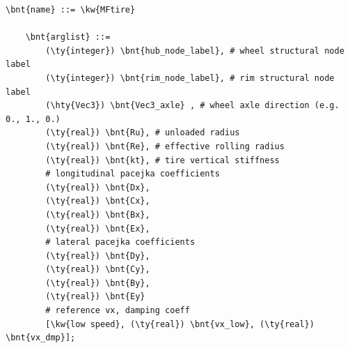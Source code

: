\begin{Verbatim}[commandchars=\\\{\}]
    \bnt{name} ::= \kw{MFtire}

    \bnt{arglist} ::=
        (\ty{integer}) \bnt{hub_node_label}, # wheel structural node label
        (\ty{integer}) \bnt{rim_node_label}, # rim structural node label
        (\hty{Vec3}) \bnt{Vec3_axle} , # wheel axle direction (e.g. 0., 1., 0.)
        (\ty{real}) \bnt{Ru}, # unloaded radius
        (\ty{real}) \bnt{Re}, # effective rolling radius
        (\ty{real}) \bnt{kt}, # tire vertical stiffness
        # longitudinal pacejka coefficients
        (\ty{real}) \bnt{Dx},
        (\ty{real}) \bnt{Cx},
        (\ty{real}) \bnt{Bx},
        (\ty{real}) \bnt{Ex},
        # lateral pacejka coefficients
        (\ty{real}) \bnt{Dy},
        (\ty{real}) \bnt{Cy},
        (\ty{real}) \bnt{By},
        (\ty{real}) \bnt{Ey}
        # reference vx, damping coeff
        [\kw{low speed}, (\ty{real}) \bnt{vx_low}, (\ty{real}) \bnt{vx_dmp}];
\end{Verbatim}
